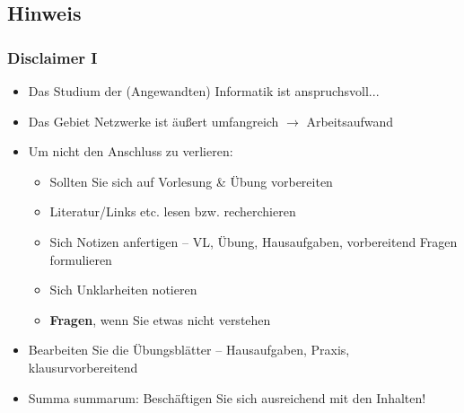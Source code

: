 \documentclass[xcolor=dvipsnames,aspectratio=169]{beamer}
\begin{document}
\subsection{Hinweis}
\begin{frame}
	\frametitle{Disclaimer I}
	\begin{itemize}
		\item Das Studium der (Angewandten) Informatik ist anspruchsvoll...
		\item Das Gebiet Netzwerke ist äußert umfangreich $\rightarrow$ Arbeitsaufwand
		\item Um nicht den Anschluss zu verlieren:
		\begin{itemize}
			\item Sollten Sie sich auf Vorlesung \& Übung vorbereiten
			\item Literatur/Links etc. lesen bzw. recherchieren
			\item Sich Notizen anfertigen -- VL, Übung, Hausaufgaben, vorbereitend Fragen formulieren
			\item Sich Unklarheiten notieren
			\item \textbf{Fragen}, wenn Sie etwas nicht verstehen 
	\end{itemize}		
		\item Bearbeiten Sie die Übungsblätter -- Hausaufgaben, Praxis, klausurvorbereitend
		\item Sum­ma sum­ma­rum: Beschäftigen Sie sich ausreichend mit den Inhalten!
	\end{itemize}
\end{frame}
\end{document}
